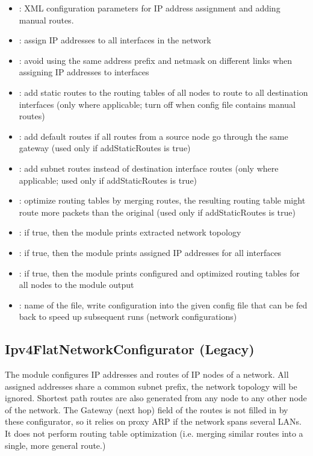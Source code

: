 \begin{itemize}
  \item {}: XML configuration parameters for IP address assignment
    and adding manual routes.
  \item {}: assign IP addresses to all interfaces in the network
  \item {}: avoid using the same address prefix and
    netmask on different links when assigning IP addresses to interfaces
  \item {}: add static routes to the routing tables of all nodes
    to route to all destination interfaces (only where applicable; turn off when
    config file contains manual routes)
  \item {}: add default routes if all routes from a source node
     go through the same gateway (used only if addStaticRoutes is true)
  \item {}: add subnet routes instead of destination interface routes
    (only where applicable; used only if addStaticRoutes is true)
  \item {}: optimize routing tables by merging routes, the
    resulting routing table might route more packets than the original
    (used only if addStaticRoutes is true)
  \item {}: if true, then the module prints extracted network topology
  \item {}: if true, then the module prints assigned IP addresses
    for all interfaces
  \item {}: if true, then the module prints configured and optimized
    routing tables for all nodes to the module output
  \item {}: name of the file, write configuration into the given
    config file that can be fed back to speed up subsequent runs (network configurations)
\end{itemize}

\subsection{Ipv4FlatNetworkConfigurator (Legacy)}
\label{sec:autoconfig:ipv4flatnetworkconfigurator}

The  module configures
IP addresses and routes of IP nodes of a network.
All assigned addresses share a common subnet prefix,
the network topology will be ignored. Shortest path
routes are also generated from any node to any other
node of the network. The Gateway (next hop) field of the routes
is not filled in by these configurator, so it relies
on proxy ARP if the network spans several LANs.
It does not perform routing table optimization (i.e.
merging similar routes into a single, more general route.)


